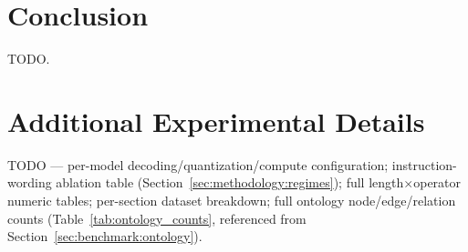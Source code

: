 \documentclass[11pt]{article}
\begin{document}
\section{Conclusion}
\label{sec:conclusion}
TODO.

% 
% 

\appendix
\section{Additional Experimental Details}
\label{sec:appendix}
TODO --- per-model decoding/quantization/compute configuration; instruction-wording ablation table (Section~\ref{sec:methodology:regimes}); full length$\times$operator numeric tables; per-section dataset breakdown; full ontology node/edge/relation counts (Table~\ref{tab:ontology_counts}, referenced from Section~\ref{sec:benchmark:ontology}).
\end{document}
